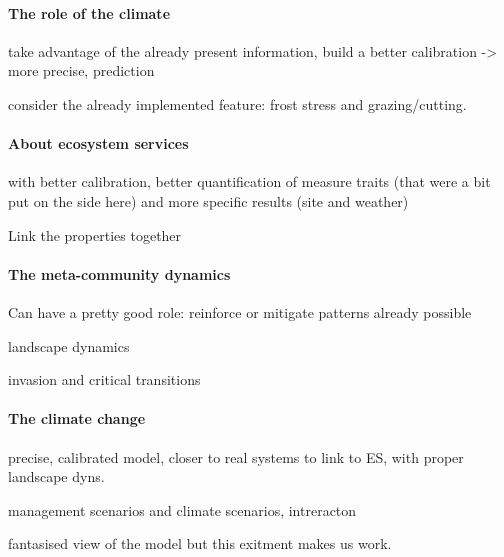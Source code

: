 \paragraph{The role of the climate}

take advantage of the already present information,
build a better calibration -> more precise, prediction

consider the already implemented feature: frost stress and grazing/cutting.

\paragraph{About ecosystem services}

with better calibration, better quantification of measure traits (that were a bit put on the side here) and more specific results (site and weather)

Link the properties together

\paragraph{The meta-community dynamics}

Can have a pretty good role: reinforce or mitigate patterns 
already possible

landscape dynamics

invasion and critical transitions

\paragraph{The climate change}

precise, calibrated model, closer to real systems to link to ES, with proper landscape dyns.

management scenarios and climate scenarios, intreracton \cite{deleglise_drought-induced_2015}

fantasised view of the model but this exitment makes us work.


